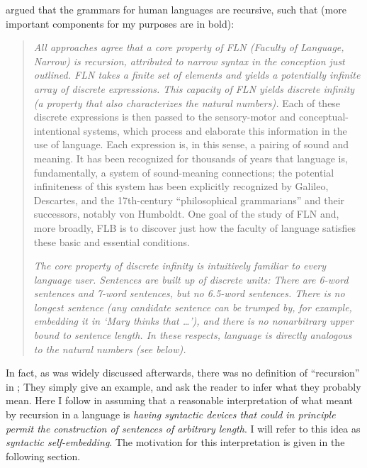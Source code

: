 \documentclass{article}
\begin{document}

\cite{hauser2002faculty} argued that the grammars for human languages are recursive, such that (more important components for my purposes are in bold):

\begin{quote}
\emph{All approaches agree that a core property of FLN (Faculty of Language, Narrow) is recursion, attributed to narrow syntax in the conception just outlined. FLN takes a finite set of elements and yields a potentially infinite array of discrete expressions. This capacity of FLN yields discrete infinity (a property that also characterizes the natural numbers).} Each of these discrete expressions is then passed to the sensory-motor and conceptual-intentional systems, which process and elaborate this information in the use of language. Each expression is, in this sense, a pairing of sound and meaning. It has been recognized for thousands of years that language is, fundamentally, a system of sound-meaning connections; the potential infiniteness of this system has been explicitly recognized by Galileo, Descartes, and the 17th-century ``philosophical grammarians'' and their successors, notably von Humboldt. One goal of the study of FLN and, more broadly, FLB is to discover just how the faculty of language satisfies these basic and essential conditions.

\emph{The core property of discrete infinity is intuitively familiar to every language user. Sentences are built up of discrete units:  There are 6-word sentences and 7-word sentences, but no 6.5-word sentences.  There is no longest sentence (any candidate sentence can be trumped by, for example, embedding it in `Mary thinks that  \ldots '), and there is no nonarbitrary upper bound to sentence length.  In these respects, language is directly analogous to the natural numbers (see below). } \citep[1571]{hauser2002faculty}
\end{quote}

In fact, as was widely discussed afterwards, there was no definition of ``recursion'' in \cite{hauser2002faculty};  They simply give an example, and ask the reader to infer what they probably mean.  
Here I follow \cite{pullum2020theorizing}  in assuming that a reasonable interpretation of what  \cite{hauser2002faculty} meant by recursion in a language is \textit{having syntactic devices that could in principle permit the construction of sentences of arbitrary length}.  I will refer to  this idea as \emph{syntactic self-embedding}.  The motivation for this interpretation is given in the following section.
\end{document}
